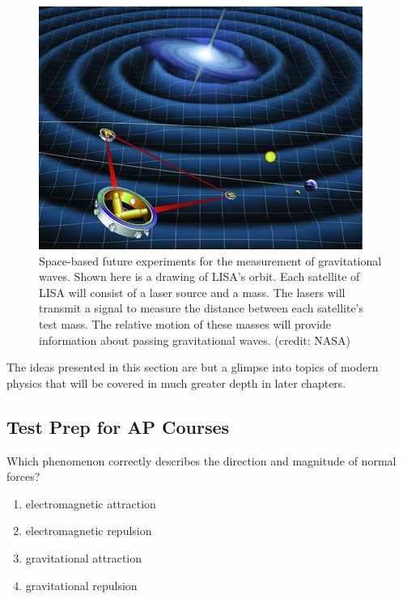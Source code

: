 \documentclass[
]{book}
\providecommand{\tightlist}{%
  \setlength{\itemsep}{0pt}\setlength{\parskip}{0pt}}
\begin{document}
\begin{figure}
\hypertarget{import-auto-id3032532}{%
\centering
\includegraphics{images/Figure_04_08_04.jpg}
\caption{Space-based future experiments for the measurement of gravitational
waves. Shown here is a drawing of LISA's orbit. Each satellite of LISA
will consist of a laser source and a mass. The lasers will transmit a
signal to measure the distance between each satellite's test mass. The
relative motion of these masses will provide information about passing
gravitational waves. (credit:
NASA)}\label{import-auto-id3032532}
}
\end{figure}

The ideas presented in this section are but a glimpse into topics of
modern physics that will be covered in much greater depth in later
chapters.

\hypertarget{fs-id1546076}{}
\hypertarget{test-prep-for-ap-courses-14}{%
\subsection{Test Prep for AP Courses}\label{test-prep-for-ap-courses-14}}

\hypertarget{fs-id1342174}{}
\leavevmode{}%
Which phenomenon correctly describes the direction and magnitude of
normal forces?

\begin{enumerate}
\def\labelenumi{\alph{enumi}.}
\tightlist
\item
  electromagnetic attraction
\item
  electromagnetic repulsion
\item
  gravitational attraction
\item
  gravitational repulsion
\end{enumerate}
\end{document}
